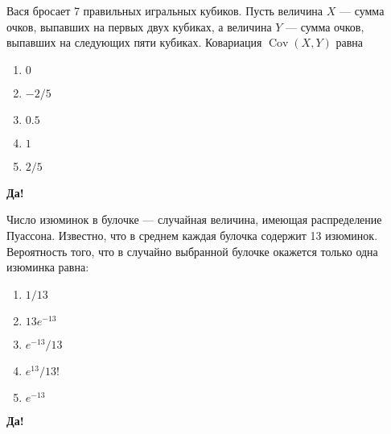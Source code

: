 \documentclass[t]{beamer}
\DeclareMathOperator{\Cov}{Cov}
\begin{document}
 \begin{frame} \label{11-Yes} 
\begin{block}{11} 

Вася бросает 7 правильных игральных кубиков. Пусть величина  $X$ — сумма очков, выпавших на первых двух кубиках, а величина  $Y$ — сумма очков, выпавших на следующих пяти кубиках. Ковариация $\Cov(X,Y)$ равна
 


 \end{block} 
\begin{enumerate} 
\item[] \hyperlink{11-Yes}{\beamergotobutton{} $0$}
\item[] \hyperlink{11-No}{\beamergotobutton{} $-2/5$
}
\item[] \hyperlink{11-No}{\beamergotobutton{} $0.5$}
\item[] \hyperlink{11-No}{\beamergotobutton{} $1$}
\item[] \hyperlink{11-No}{\beamergotobutton{} $2/5$}
\end{enumerate} 

 \textbf{Да!} 
 \hyperlink{12}{}\end{frame} 


 \begin{frame} \label{12-Yes} 
\begin{block}{12} 

Число изюминок в булочке — случайная величина, имеющая распределение Пуассона. Известно, что в среднем каждая булочка содержит 13 изюминок. Вероятность того, что в случайно выбранной булочке окажется только одна изюминка равна:
 


 \end{block} 
\begin{enumerate} 
\item[] \hyperlink{12-No}{\beamergotobutton{} $1/13$}
\item[] \hyperlink{12-Yes}{\beamergotobutton{} $13e^{-13}$}
\item[] \hyperlink{12-No}{\beamergotobutton{} $e^{-13}/13$}
\item[] \hyperlink{12-No}{\beamergotobutton{} $e^{13}/13!$}
\item[] \hyperlink{12-No}{\beamergotobutton{} $e^{-13}$}
\end{enumerate} 

 \textbf{Да!} 
 \hyperlink{13}{}\end{frame} 
\end{document}
